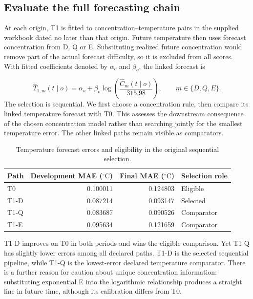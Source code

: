 \documentclass[11pt,a4paper]{article}
\newcommand{\p}[2]{#2\par}
\newcommand{\txt}[2]{#2}
\newcommand{\degC}{\ensuremath{{}^{\circ}\mathrm{C}}}
\begin{document}
\subsection{Evaluate the full forecasting chain}
\p{TEM03}{At each origin, T1 is fitted to concentration--temperature pairs in the supplied workbook dated no later than that origin. Future temperature then uses forecast concentration from D, Q or E. Substituting realized future concentration would remove part of the actual forecast difficulty, so it is excluded from all scores. With fitted coefficients denoted by $\alpha_o$ and $\beta_o$, the linked forecast is}
\begin{equation}\label{eq:linked}
\widehat T_{1,m}(t\mid o)=\alpha_o+\beta_o\log\!\left(\frac{\widehat C_m(t\mid o)}{315.98}\right),\qquad m\in\{D,Q,E\}.
\end{equation}
\p{TEM04}{The selection is sequential. We first choose a concentration rule, then compare its linked temperature forecast with T0. This assesses the downstream consequence of the chosen concentration model rather than searching jointly for the smallest temperature error. The other linked paths remain visible as comparators.}
\begin{table}[H]\centering\small
\caption{\txt{TC06}{Temperature forecast errors and eligibility in the original sequential selection.}}\label{tab:temp-errors}
\begin{tabular}{lrrl}\toprule
Path & Development MAE (\degC) & Final MAE (\degC) & Selection role\\\midrule
T0 & 0.100011 & 0.124803 & Eligible\\
T1-D & 0.087214 & 0.093147 & Selected\\
T1-Q & 0.083687 & 0.090526 & Comparator\\
T1-E & 0.095634 & 0.121659 & Comparator\\\bottomrule
\end{tabular}
\end{table}
\p{TEM05}{T1-D improves on T0 in both periods and wins the eligible comparison. Yet T1-Q has slightly lower errors among all declared paths. T1-D is the selected sequential pipeline, while T1-Q is the lowest-error declared temperature comparator. There is a further reason for caution about unique concentration information: substituting exponential E into the logarithmic relationship produces a straight line in future time, although its calibration differs from T0.}
\end{document}
